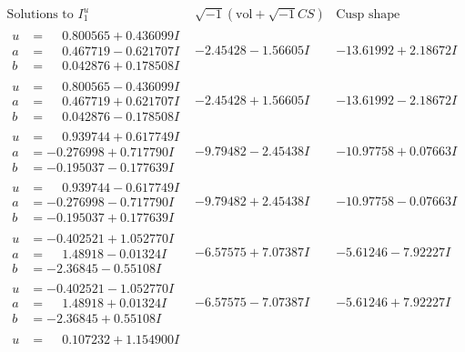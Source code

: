 \documentclass[1p]{elsarticle_modified}
\theoremstyle{definition}
\newcommand{\I}{\sqrt{-1}}
\begin{document}
$$\begin{array}{c|c|c}  
\text{Solutions to }I^u_{1}& \I (\text{vol} + \sqrt{-1}CS) & \text{Cusp shape}\\
 \hline 
\begin{aligned}
u &= \phantom{-}0.800565 + 0.436099 I \\
a &= \phantom{-}0.467719 - 0.621707 I \\
b &= \phantom{-}0.042876 + 0.178508 I\end{aligned}
 & -2.45428 - 1.56605 I & -13.61992 + 2.18672 I \\ \hline\begin{aligned}
u &= \phantom{-}0.800565 - 0.436099 I \\
a &= \phantom{-}0.467719 + 0.621707 I \\
b &= \phantom{-}0.042876 - 0.178508 I\end{aligned}
 & -2.45428 + 1.56605 I & -13.61992 - 2.18672 I \\ \hline\begin{aligned}
u &= \phantom{-}0.939744 + 0.617749 I \\
a &= -0.276998 + 0.717790 I \\
b &= -0.195037 - 0.177639 I\end{aligned}
 & -9.79482 - 2.45438 I & -10.97758 + 0.07663 I \\ \hline\begin{aligned}
u &= \phantom{-}0.939744 - 0.617749 I \\
a &= -0.276998 - 0.717790 I \\
b &= -0.195037 + 0.177639 I\end{aligned}
 & -9.79482 + 2.45438 I & -10.97758 - 0.07663 I \\ \hline\begin{aligned}
u &= -0.402521 + 1.052770 I \\
a &= \phantom{-}1.48918 - 0.01324 I \\
b &= -2.36845 - 0.55108 I\end{aligned}
 & -6.57575 + 7.07387 I & -5.61246 - 7.92227 I \\ \hline\begin{aligned}
u &= -0.402521 - 1.052770 I \\
a &= \phantom{-}1.48918 + 0.01324 I \\
b &= -2.36845 + 0.55108 I\end{aligned}
 & -6.57575 - 7.07387 I & -5.61246 + 7.92227 I \\ \hline\begin{aligned}
u &= \phantom{-}0.107232 + 1.154900 I \\

\end{aligned}
\end{array}$$
\end{document}
